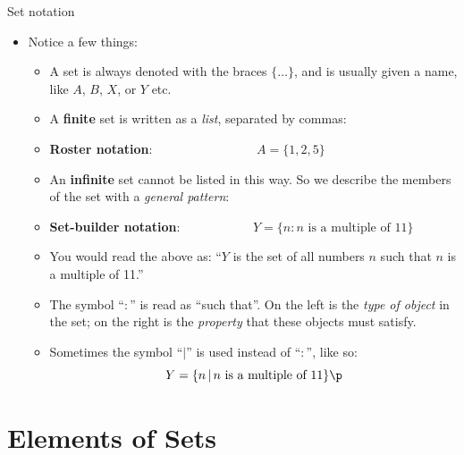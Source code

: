 \documentclass[11pt,aspectratio=1610]{beamer}
\begin{document}
\begin{frame}{Set notation} \p
	\begin{itemize} 
		\item Notice a few things: \p
		\begin{itemize}\itemsep2mm
			\item A set is always denoted with the braces $\{ \ldots \}$, and is usually given a name, like $A$, $B$, $X$, or $Y$ etc. \p
			\item A \textbf{finite} set is written as a \emph{list}, separated by commas:
			\vspace{2mm}
			
			\item[\finger] \textbf{Roster notation}:~~~~~~~~~~~~~~~~ $A = \{1, 2, 5\}$ \p
			\vspace{2mm}
			
			\item An \textbf{infinite} set cannot be listed in this way. So we describe the members of the set with a \emph{general pattern}: \p
		
			\item[\finger] \textbf{Set-builder notation}:~~~~~~~~~~~ $Y = \{n : n \textrm{ is a multiple of } 11\}$ 
			\p \vspace{2mm}
		
		\item You would read the above as: ``$Y$ is the set of all numbers $n$ such that $n$ is a multiple of 11.'' \p
		
			\item The symbol ``$:$'' is read as ``such that''. On the left is the \emph{type of object} in the set; on the right is the \emph{property} that these objects must satisfy. \p
			\item Sometimes the symbol ``$|$'' is used instead of ``$:$'', like so: 
			\[
			Y = \{n \,|\, n \textrm{ is a multiple of } 11\}\p
			\]
		\end{itemize}
	\end{itemize}
\end{frame}

\section{Elements of Sets}
\end{document}
